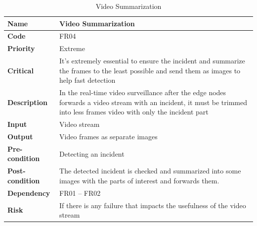 \documentclass[12pt]{article}
\begin{document}
\FloatBarrier
\begin{table}[h!]
\caption{Video Summarization}
\begin{tabular}{|p{}|p{}|}
\hline
\textbf{Name}           &  Video Summarization \\ \hline
\textbf{Code}           & FR04 \\ \hline
\textbf{Priority}       & Extreme \\ \hline
\textbf{Critical}       & It's extremely essential to ensure the incident and summarize the frames to the least possible and send them as images to help fast detection \\ \hline
\textbf{Description}    &In the real-time video surveillance after the edge nodes forwards a video stream with an incident, it must be trimmed into less frames video with only the incident part  \\ \hline
\textbf{Input}          & Video stream                       \\ \hline
\textbf{Output}         & Video frames as separate images      \\ \hline
\textbf{Pre-condition}  & Detecting an incident            \\ \hline
\textbf{Post-condition} &The detected incident is checked and summarized into some images with the parts of interest and forwards them. \\ \hline
\textbf{Dependency}     & FR01 – FR02                                       \\ \hline
\textbf{Risk}           & If there is any failure that impacts the usefulness of the video stream \\ \hline
\end{tabular}
\end{table} 
\FloatBarrier
\end{document}

